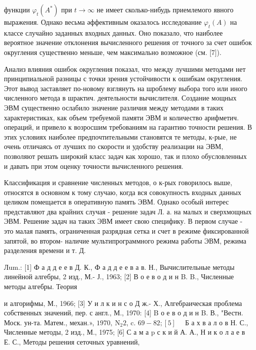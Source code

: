 \documentclass[10pt]{article}
\begin{document}
функции $\varphi_{t}\left(A^{*}\right)$ при $t \rightarrow \infty$ не имеет сколько-нибудь приемлемого явного выражения. Однако весьма әффективным оказалось исследование $\varphi_{t}(A)$ на классе случайно заданных входных данных. Оно показало, что наиболее вероятное значение отклонения вычисленного решения от точного за счет ошибок округления существенно меньше, чем максимально возможное (см. [7]).



Анализ влияния ошибок округления показал, что между лучшими методами нет принципиальной разницы с точки зрения устойчивости к ошибкам округления. Этот вывод заставляет по-новому взглянуть на шроблему выбора того или иного численного метода в шрактич. деятельности вычислителя. Создание мощных ЭВМ существенно ослабило значение различия между методами в таких характеристиках, как объем требуемой памяти ЭВМ и количество арифметич. операций, и привело к возросшим требованиям на гарантию точности решения. В этих условиях наиболее предпочтительными становятся те методы, к-рые, не очень отличаясь от лучших по скорости и удобству реализации на ЭВМ, позволяют решать широкий класс задач как хорошо, так и плохо обусловленных и давать при этом оценку точности вычисленного решения.



Классификация и сравнение численных методов, о к-рых говорилось выше, относятся в основном к тому случаю, когда вся совокупность входных данных целиком помещается в оперативную память ЭВМ. Однако особый интерес представляют два крайних случая - решение задач Л. а. на малых и сверхмощных ЭВМ. Решение задач на таких ЭВМ имеет свою специфику. В первом случае - это малая память, ограниченная разрядная сетка и счет в режиме фиксированной запятой, во втором- наличие мультипрограммного режима работы ЭВМ, режима разделения времени и т. Д.



Лum.: [1] Ф а д д е е в Д. К., Ф а д д е е в а в. Н., Вычислительные методы линейной алгебры, 2 изд., М.- Ј., 1963; [2] В о е в о д и н B. B., Численные методы алгебры. Теория

и алгорифмы, М., 1966; [3] У и л к и н с о Д ж.- Х., Алгебраическая проблема собственных значений, пер. с англ., М., 1970: [4] B о е в о д и н B. В., "Вестн. Моск. ун-та. Матем., механ.», $1970, \mathrm{~N}_{2} 2$, c. $69-82 ;[5] \quad$ Б а х в а л о в Н. С., Численные методы, 2 изд., М., 1975; [6] С а м а p с к и й А. А., Н и к о л а е в Е. С., Методы решения сеточных уравнений,
\end{document}
